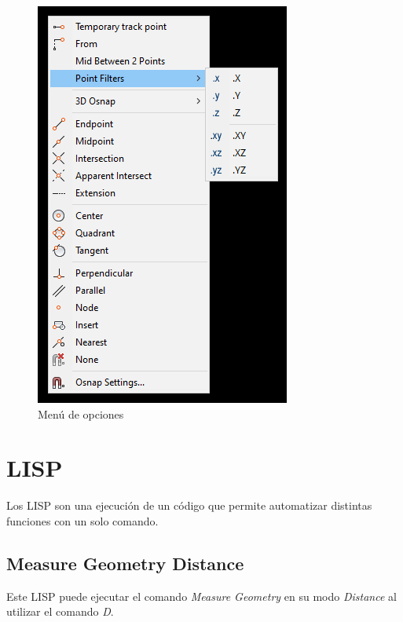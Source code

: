 \documentclass[12pt,letterpaper,final]{report}
\begin{document}
\begin{figure}[H]
	\centering
	\includegraphics[width=0.85\linewidth, height=0.45\textheight,keepaspectratio]{Imagenes/autocad_rightclickmenu01}
	\caption{Menú de opciones}
	\label{fig:autocadrightclickmenu01}
\end{figure}


\chapter{LISP}

Los LISP son una ejecución de un código que permite automatizar distintas funciones con un solo comando.

\section{Measure Geometry Distance}

Este LISP puede ejecutar el comando \emph{Measure Geometry} en su modo \emph{Distance} al utilizar el comando \emph{D}. 
\end{document}
